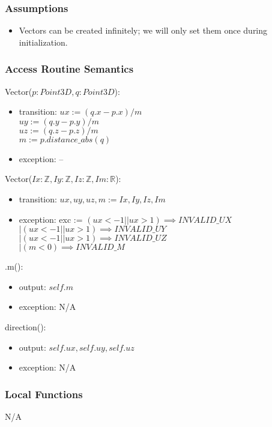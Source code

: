 \documentclass[12pt, titlepage]{article}
\begin{document}
\subsubsection{Assumptions}
\begin{itemize}
	\item Vectors can be created infinitely; we will only set them once during 
	initialization.			
\end{itemize}

\subsubsection{Access Routine Semantics}
\noindent Vector($p:Point3D, q:Point3D$):
\begin{itemize}
	\item transition: $ux:= (q.x - p.x)/m$ \\
	$uy:= (q.y - p.y)/m$ \\
	$uz:= (q.z - p.z)/m$ \\
	$m := p.distance\_abs(q)$\\
	\item exception: --
\end{itemize}

\noindent Vector($Ix: \mathbb{Z}, Iy: \mathbb{Z}, Iz: \mathbb{Z}, Im: 
\mathbb{R} 
$):
\begin{itemize}
	\item transition: $ux, uy, uz, m := Ix, Iy, Iz, Im$
	\item exception: exc := $(ux < -1 || ux > 1) \implies INVALID\_UX$ \\
	$ | (ux < -1 || ux > 1) \implies INVALID\_UY$ \\ $| (ux < -1 || ux > 1) 
	\implies INVALID\_UZ$ \\ $| (m < 0) \implies INVALID\_M$
\end{itemize}

\noindent .m():
\begin{itemize}
	\item output: $self.m$
	\item exception: N/A
\end{itemize}

\noindent direction():
\begin{itemize}
	\item output: $self.ux, self.uy, self.uz$
	\item exception: N/A
\end{itemize}

\subsubsection{Local Functions}
N/A
\end{document}
